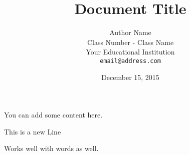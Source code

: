 \documentclass[12pt,fleqn,leqno,letterpaper]{article}
\title{Document Title}
\author{Author Name\\
  \small{Class Number - Class Name}\\
  \small{Your Educational Institution}\\
  \small{\texttt{email@address.com}}
}
\date{December 15, 2015}
\begin{document}
\maketitle



You can add some content here.

This is a new Line

Works well with words as well.



\end{document}

